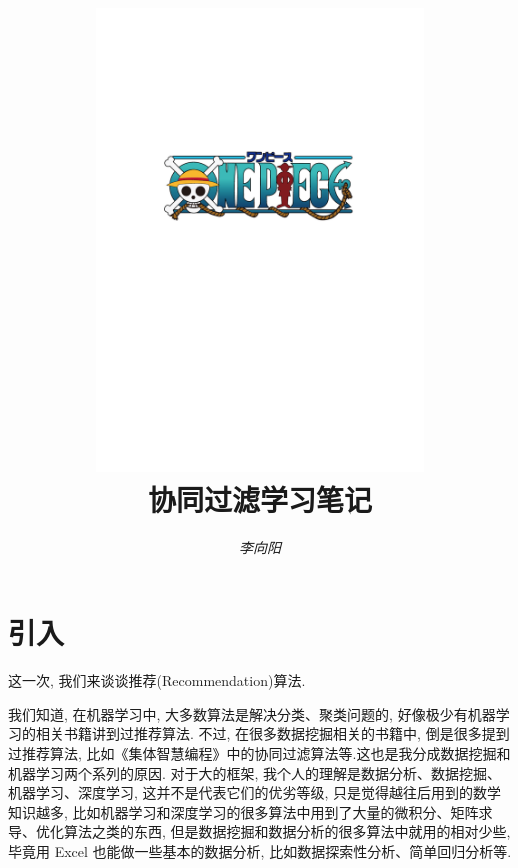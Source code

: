 \documentclass[a4paper,UTF8]{ctexart}
\theoremstyle{plain} \newtheorem{theorem}{定理}[section]
\theoremstyle{plain} \newtheorem{definition}{定义}[section]
\theoremstyle{plain} \newtheorem{lemma}{引理}[section]
\theoremstyle{plain} \newtheorem{proposition}{命题}[section]
\theoremstyle{plain} \newtheorem{example}{例}[section]
\theoremstyle{plain} \newtheorem{remark}{注}[section]
\theoremstyle{plain} \newtheorem{corollary}{推论}[section]
\begin{document}
\title{
\includegraphics[width=0.65\textwidth]{onepiece.pdf}\\
\vspace{2em}
\textbf{协同过滤学习笔记}}
\author{\emph{李向阳} \color{blue}{d1142845997@gmail.com}}
\date{}


\maketitle
\thispagestyle{empty}

\newpage


\tableofcontents

\newpage

\section{引入}
这一次, 我们来谈谈推荐(Recommendation)算法.

我们知道, 在机器学习中, 大多数算法是解决分类、聚类问题的, 好像极少有机器学习的相关书籍讲到过推荐算法. 不过, 在很多数据挖掘相关的书籍中, 倒是很多提到过推荐算法, 比如《集体智慧编程》中的协同过滤算法等.这也是我分成数据挖掘和机器学习两个系列的原因. 对于大的框架, 我个人的理解是数据分析、数据挖掘、机器学习、深度学习, 这并不是代表它们的优劣等级, 只是觉得越往后用到的数学知识越多, 比如机器学习和深度学习的很多算法中用到了大量的微积分、矩阵求导、优化算法之类的东西, 但是数据挖掘和数据分析的很多算法中就用的相对少些, 毕竟用 Excel 也能做一些基本的数据分析, 比如数据探索性分析、简单回归分析等.
\end{document}
